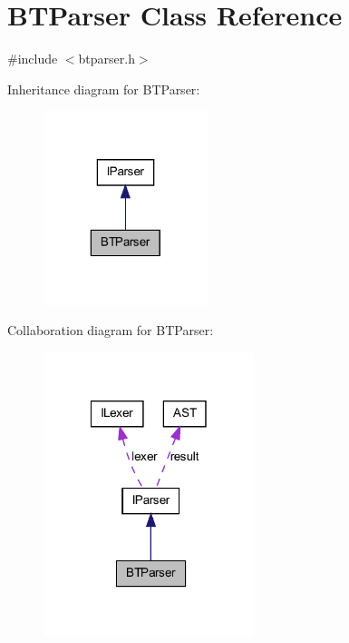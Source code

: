 \hypertarget{class_b_t_parser}{
\section{BTParser Class Reference}
\label{class_b_t_parser}
}


{\ttfamily \#include $<$btparser.h$>$}



Inheritance diagram for BTParser:\nopagebreak
\begin{figure}[H]
\begin{center}
\leavevmode
\includegraphics[width=136pt]{class_b_t_parser__inherit__graph}
\end{center}
\end{figure}


Collaboration diagram for BTParser:\nopagebreak
\begin{figure}[H]
\begin{center}
\leavevmode
\includegraphics[width=174pt]{class_b_t_parser__coll__graph}
\end{center}
\end{figure}
